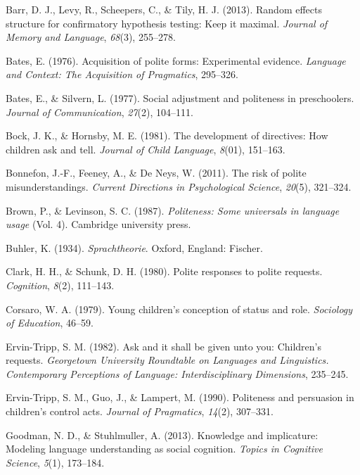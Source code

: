 \documentclass[10pt, letterpaper]{article}
\begin{document}
\hypertarget{refs}{}
\hypertarget{ref-barr2013}{}
Barr, D. J., Levy, R., Scheepers, C., \& Tily, H. J. (2013). Random
effects structure for confirmatory hypothesis testing: Keep it maximal.
\emph{Journal of Memory and Language}, \emph{68}(3), 255--278.

\hypertarget{ref-bates1976}{}
Bates, E. (1976). Acquisition of polite forms: Experimental evidence.
\emph{Language and Context: The Acquisition of Pragmatics}, 295--326.

\hypertarget{ref-bates1977}{}
Bates, E., \& Silvern, L. (1977). Social adjustment and politeness in
preschoolers. \emph{Journal of Communication}, \emph{27}(2), 104--111.

\hypertarget{ref-bock1981}{}
Bock, J. K., \& Hornsby, M. E. (1981). The development of directives:
How children ask and tell. \emph{Journal of Child Language},
\emph{8}(01), 151--163.

\hypertarget{ref-bonnefon2011}{}
Bonnefon, J.-F., Feeney, A., \& De Neys, W. (2011). The risk of polite
misunderstandings. \emph{Current Directions in Psychological Science},
\emph{20}(5), 321--324.

\hypertarget{ref-brown1987}{}
Brown, P., \& Levinson, S. C. (1987). \emph{Politeness: Some universals
in language usage} (Vol. 4). Cambridge university press.

\hypertarget{ref-buhler1934}{}
Buhler, K. (1934). \emph{Sprachtheorie}. Oxford, England: Fischer.

\hypertarget{ref-clark1980}{}
Clark, H. H., \& Schunk, D. H. (1980). Polite responses to polite
requests. \emph{Cognition}, \emph{8}(2), 111--143.

\hypertarget{ref-corsaro1979}{}
Corsaro, W. A. (1979). Young children's conception of status and role.
\emph{Sociology of Education}, 46--59.

\hypertarget{ref-ervin1982}{}
Ervin-Tripp, S. M. (1982). Ask and it shall be given unto you:
Children's requests. \emph{Georgetown University Roundtable on Languages
and Linguistics. Contemporary Perceptions of Language: Interdisciplinary
Dimensions}, 235--245.

\hypertarget{ref-ervin1990}{}
Ervin-Tripp, S. M., Guo, J., \& Lampert, M. (1990). Politeness and
persuasion in children's control acts. \emph{Journal of Pragmatics},
\emph{14}(2), 307--331.

\hypertarget{ref-goodman2013}{}
Goodman, N. D., \& Stuhlmuller, A. (2013). Knowledge and implicature:
Modeling language understanding as social cognition. \emph{Topics in
Cognitive Science}, \emph{5}(1), 173--184.
\end{document}
